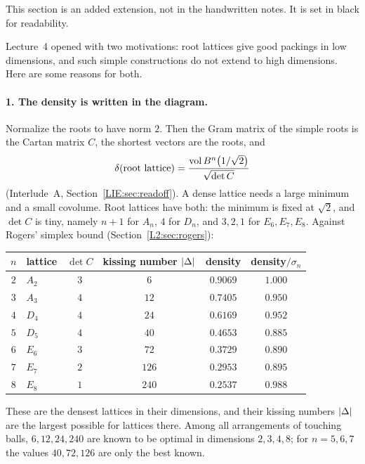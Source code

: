 \begin{addedblock}
This section is an added extension, not in the handwritten notes. It is set in black for readability.
\end{addedblock}

Lecture~4 opened with two motivations: root lattices give good packings in low dimensions, and such
simple constructions do not extend to high dimensions. Here are some reasons for both.

\paragraph{1. The density is written in the diagram.} Normalize the roots to have norm $2$. Then the
Gram matrix of the simple roots is the Cartan matrix $C$, the shortest vectors are the roots, and
\[
  \delta(\text{root lattice})=\frac{\operatorname{vol}B^n\big(1/\sqrt2\big)}{\sqrt{\det C}}
\]
(Interlude~A, Section~\ref{LIE:sec:readoff}). A dense lattice needs a large minimum and a small
covolume. Root lattices have both: the minimum is fixed at $\sqrt2$, and $\det C$ is tiny, namely
$n+1$ for $A_n$, $4$ for $D_n$, and $3,2,1$ for $E_6,E_7,E_8$. Against Rogers' simplex bound
(Section~\ref{L2:sec:rogers}):
\begin{center}
\renewcommand{\arraystretch}{1.15}
\begin{tabular}{clcccc}
\toprule
$n$ & lattice & $\det C$ & kissing number $\left\lvert \Delta \right\rvert$ & density & density$/\sigma_n$\\
\midrule
$2$ & $A_2$ & $3$ & $6$ & $0.9069$ & $1.000$\\
$3$ & $A_3$ & $4$ & $12$ & $0.7405$ & $0.950$\\
$4$ & $D_4$ & $4$ & $24$ & $0.6169$ & $0.952$\\
$5$ & $D_5$ & $4$ & $40$ & $0.4653$ & $0.885$\\
$6$ & $E_6$ & $3$ & $72$ & $0.3729$ & $0.890$\\
$7$ & $E_7$ & $2$ & $126$ & $0.2953$ & $0.895$\\
$8$ & $E_8$ & $1$ & $240$ & $0.2537$ & $0.988$\\
\bottomrule
\end{tabular}
\end{center}
These are the densest lattices in their dimensions, and their kissing numbers $\left\lvert \Delta \right\rvert$ are the
largest possible for lattices there. Among all arrangements of touching balls, $6,12,24,240$ are known to
be optimal in dimensions $2,3,4,8$; for $n=5,6,7$ the values $40,72,126$ are only the best known.

